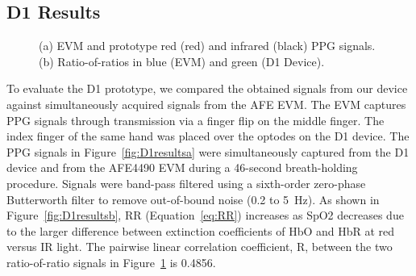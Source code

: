 \subsection{D1 Results}
\begin{figure}
    \begin{center}
    \end{center}
    \caption{(a) EVM and prototype red (red) and infrared (black) PPG signals. (b) Ratio-of-ratios in blue (EVM) and green (D1 Device).} 
    \label{fig:D1results}
\end{figure}
To evaluate the D1 prototype, we compared the obtained signals from our device against simultaneously acquired signals from the AFE EVM. The EVM captures PPG signals through transmission via a finger flip on the middle finger. The index finger of the same hand was placed over the optodes on the D1 device. The PPG signals in Figure~\ref{fig:D1resultsa} were simultaneously captured from the D1 device and from the AFE4490 EVM during a 46-second breath-holding procedure. Signals were band-pass filtered using a sixth-order zero-phase Butterworth filter to remove out-of-bound noise (0.2 to 5~Hz). As shown in Figure~\ref{fig:D1resultsb}, RR (Equation~\ref{eq:RR}) increases as SpO2 decreases due to the larger difference between extinction coefficients of HbO and HbR at red versus IR light. The pairwise linear correlation coefficient, R, between the two ratio-of-ratio signals in Figure~\ref{fig:D1results} is 0.4856. 



